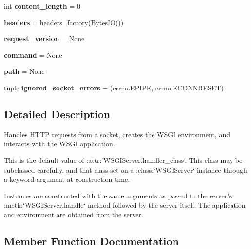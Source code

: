 \begin{DoxyCompactItemize}
int {\bfseries content\+\_\+length} = 0
\item 
\mbox{\label{classgevent_1_1pywsgi_1_1_w_s_g_i_handler_a51b45c197e992465cb77ce5f023ce862}} 
{\bfseries headers} = headers\+\_\+factory(Bytes\+IO())
\item 
\mbox{\label{classgevent_1_1pywsgi_1_1_w_s_g_i_handler_a88c376fb3f4c7c51f2c975fdbf0bc19a}} 
{\bfseries request\+\_\+version} = None
\item 
\mbox{\label{classgevent_1_1pywsgi_1_1_w_s_g_i_handler_a93786ae4b90a99e9825166b3bebc0365}} 
{\bfseries command} = None
\item 
\mbox{\label{classgevent_1_1pywsgi_1_1_w_s_g_i_handler_ac9d4c15b4f3896df1417ca6c4732a0ea}} 
{\bfseries path} = None
\item 
\mbox{\label{classgevent_1_1pywsgi_1_1_w_s_g_i_handler_aa0277943bb64286434fd33deb2e4c74b}} 
tuple {\bfseries ignored\+\_\+socket\+\_\+errors} = (errno.\+E\+P\+I\+PE, errno.\+E\+C\+O\+N\+N\+R\+E\+S\+ET)
\end{DoxyCompactItemize}


\subsection{Detailed Description}
\begin{DoxyVerb}Handles HTTP requests from a socket, creates the WSGI environment, and
interacts with the WSGI application.

This is the default value of :attr:`WSGIServer.handler_class`.
This class may be subclassed carefully, and that class set on a
:class:`WSGIServer` instance through a keyword argument at
construction time.

Instances are constructed with the same arguments as passed to the
server's :meth:`WSGIServer.handle` method followed by the server
itself. The application and environment are obtained from the server.\end{DoxyVerb}
 

\subsection{Member Function Documentation}
\mbox{\label{classgevent_1_1pywsgi_1_1_w_s_g_i_handler_a8337b61957f372c7a6cc62e57298d182}} 

